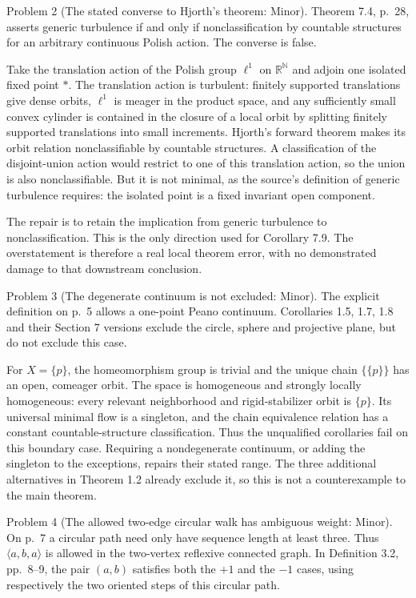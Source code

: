 \documentclass[10pt]{article}
\begin{document}
Problem 2 (The stated converse to Hjorth’s theorem: Minor).  Theorem 7.4, p. 28, asserts generic turbulence if and only if nonclassification by countable structures for an arbitrary continuous Polish action. The converse is false.\par
Take the translation action of the Polish group \(\ell^1\) on \(\mathbb R^{\mathbb N}\) and adjoin one isolated fixed point \(*\). The translation action is turbulent: finitely supported translations give dense orbits, \(\ell^1\) is meager in the product space, and any sufficiently small convex cylinder is contained in the closure of a local orbit by splitting finitely supported translations into small increments. Hjorth’s forward theorem makes its orbit relation nonclassifiable by countable structures. A classification of the disjoint-union action would restrict to one of this translation action, so the union is also nonclassifiable. But it is not minimal, as the source’s definition of generic turbulence requires: the isolated point is a fixed invariant open component.\par
The repair is to retain the implication from generic turbulence to nonclassification. This is the only direction used for Corollary 7.9. The overstatement is therefore a real local theorem error, with no demonstrated damage to that downstream conclusion.\par
Problem 3 (The degenerate continuum is not excluded: Minor).  The explicit definition on p. 5 allows a one-point Peano continuum. Corollaries 1.5, 1.7, 1.8 and their Section 7 versions exclude the circle, sphere and projective plane, but do not exclude this case.\par
For \(X=\{p\}\), the homeomorphism group is trivial and the unique chain \(\{\{p\}\}\) has an open, comeager orbit. The space is homogeneous and strongly locally homogeneous: every relevant neighborhood and rigid-stabilizer orbit is \(\{p\}\). Its universal minimal flow is a singleton, and the chain equivalence relation has a constant countable-structure classification. Thus the unqualified corollaries fail on this boundary case. Requiring a nondegenerate continuum, or adding the singleton to the exceptions, repairs their stated range. The three additional alternatives in Theorem 1.2 already exclude it, so this is not a counterexample to the main theorem.\par
Problem 4 (The allowed two-edge circular walk has ambiguous weight: Minor).  On p. 7 a circular path need only have sequence length at least three. Thus \(\langle a,b,a\rangle\) is allowed in the two-vertex reflexive connected graph. In Definition 3.2, pp. 8–9, the pair \((a,b)\) satisfies both the \(+1\) and the \(-1\) cases, using respectively the two oriented steps of this circular path.\par
\end{document}
